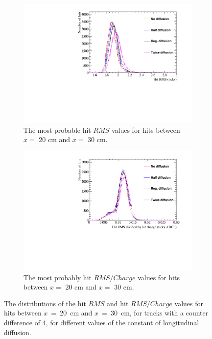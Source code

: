 \begin{figure}
  \centering
  \begin{subfigure}{0.48\textwidth}
    \centering
    \includegraphics[width=\textwidth]{Canvas_RMS_20cm_Diffusion}
    \caption{The most probable hit $RMS$ values for hits between $x =$ 20 cm and $x =$ 30 cm.}
  \end{subfigure}%
  \hspace{0.03\textwidth}%
  \begin{subfigure}{0.48\textwidth}
    \centering
    \includegraphics[width=\textwidth]{Canvas_RMS_Q_20cm_Diffusion}
    \caption{The most probably hit $RMS/Charge$ values for hits between $x =$ 20 cm and $x =$ 30 cm.}
  \end{subfigure}
  \caption[The distributions of the hit $RMS$ and hit $RMS/Charge$ values for tracks with a counter difference of 4, for different values of the constant of longitudinal diffusion]
          {The distributions of the hit $RMS$ and hit $RMS/Charge$ values for hits between $x$~=~20~cm and $x$~=~30~cm, for tracks with a counter difference of 4, for different values of the constant of longitudinal diffusion.}
  \label{fig:DiffLDiff_HitFit}
\end{figure}

